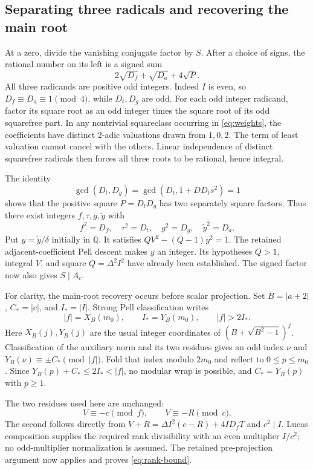 \subsection{Separating three radicals and recovering the main root}

At a zero, divide the vanishing conjugate factor by $S$. After a choice
of signs, the rational number on its left is a signed sum
\begin{equation}
 2\sqrt{D_f}+\sqrt{D_a}+4\sqrt{P}.
 \label{eq:weights}
\end{equation}
All three radicands are positive odd integers. Indeed $I$ is even, so
$D_f\equiv D_a\equiv1\pmod4$, while $D_t,D_g$ are odd.
For each odd integer radicand, factor its square root as an odd integer
times the square root of its odd squarefree part. In any nontrivial
squareclass occurring in \eqref{eq:weights}, the coefficients have
distinct 2-adic valuations drawn from $1,0,2$. The term of least
valuation cannot cancel with the others. Linear independence of distinct
squarefree radicals then forces all three roots to be rational, hence
integral.

The identity
\begin{equation}
 \gcd(D_t,D_g)=\gcd(D_t,1+DD_t s^2)=1
 \label{eq:coprime}
\end{equation}
shows that the positive square $P=D_tD_g$ has two separately square
factors. Thus there exist integers $f,\tau,g,\widetilde y$ with
\[
 f^2=D_f,\quad \tau^2=D_t,\quad g^2=D_g,\quad
 \widetilde y^2=D_a.
\]
Put $y=\widetilde y/\delta$ initially in $\mathbb Q$.
It satisfies $QV^2-(Q-1)y^2=1$. The retained adjacent-coefficient
Pell descent makes $y$ an integer. Its hypotheses $Q>1$, integral
$V$, and square $Q=\Delta^2I^2$ have already been established.
The signed factor now also gives $S\mid A_c$.

For clarity, the main-root recovery occurs before scalar projection.
Set $B=|a+2|$, $C_*=|c|$, and $I_*=|I|$. Strong Pell classification
writes
\[
 |f|=X_B(m_0),\qquad I_*=Y_B(m_0),\qquad |f|>2I_*.
\]
Here $X_B(j),Y_B(j)$ are the usual integer coordinates of
$(B+\sqrt{B^2-1})^j$. Classification of the auxiliary norm and its
two residues gives an odd index $\nu$ and
$Y_B(\nu)\equiv\pm C_*\pmod{|f|}$. Fold that index modulo $2m_0$
and reflect to $0\le p\le m_0$. Since
$Y_B(p)+C_*\le2I_*<|f|$, no modular wrap is possible, and
$C_*=Y_B(p)$ with $p\ge1$.

The two residues used here are unchanged:
\[
 V\equiv-c\pmod f,\qquad V\equiv-R\pmod c.
\]
The second follows directly from
$V+R=\Delta I^2(c-R)+4ID_fT$ and $c^2\mid I$.
Lucas composition supplies the required rank divisibility with an even
multiplier $I/c^2$; no odd-multiplier normalization is assumed. The
retained pre-projection argument now applies and proves
\eqref{eq:rank-bound}.

